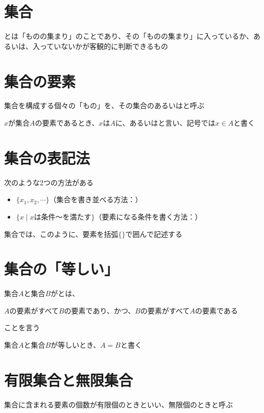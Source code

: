 \documentclass[../book_ronri-and-set]{subfiles}
\begin{document}
\sectionline
\section{集合}

とは「ものの集まり」のことであり、その「ものの集まり」に入っているか、あるいは、入っていないかが客観的に判断できるもの

\sectionline
\section{集合の要素}

集合を構成する個々の「もの」を、その集合のあるいはと呼ぶ

\br

$x$が集合$A$の要素であるとき、$x$は$A$に、あるいはと言い、記号では$x \in A$と書く

\sectionline
\section{集合の表記法}

次のような2つの方法がある
\begin{itemize}
  \item $\{x_1, x_2, \cdots \}$（集合を書き並べる方法：）
  \item $\{x \mid x \text{は条件〜を満たす}\}$（要素になる条件を書く方法：）
\end{itemize}

集合では、このように、要素を括弧$\{\}$で囲んで記述する

\sectionline
\section{集合の「等しい」}

集合$A$と集合$B$がとは、
\begin{shaded*}
  $A$の要素がすべて$B$の要素であり、かつ、$B$の要素がすべて$A$の要素である
\end{shaded*}
ことを言う

集合$A$と集合$B$が等しいとき、$A = B$と書く

\sectionline
\section{有限集合と無限集合}

集合に含まれる要素の個数が有限個のときといい、無限個のときと呼ぶ
\end{document}
